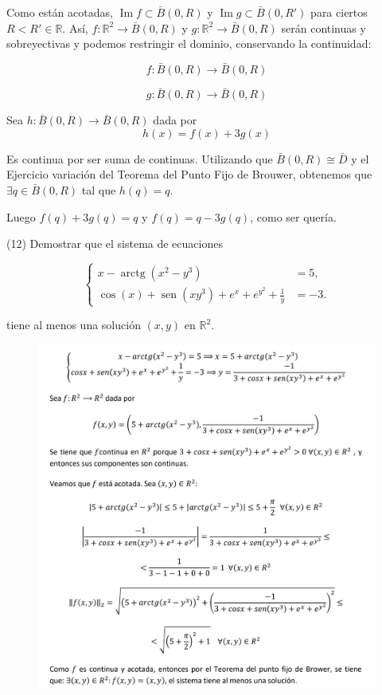 \documentclass[
  a4paper,
  spanish,
  12pt,
]{scrartcl}
\begin{document}
\begin{sol}
Como están acotadas, $\operatorname{Im} f \subset \bar{B}(0, R)$ y $\operatorname{Im} g \subset \bar{B}(0, R')$ para ciertos $R < R' \in \mathbb{R}$.
Así, $f : \mathbb{R}^2 \rightarrow \bar{B}(0, R)$ y $g: \mathbb{R}^2 \rightarrow \bar{B}(0, R)$
serán continuas y sobreyectivas y podemos restringir el dominio, conservando la continuidad:

$$
f: \bar{B}(0, R) \rightarrow \bar{B}(0, R)
$$

$$
g: \bar{B}(0, R) \rightarrow \bar{B}(0, R)
$$

Sea $h: \bar{B}(0,R) \rightarrow \bar{B}(0, R)$ dada por
$$ h(x) = f(x) + 3g(x) $$

Es continua por ser suma de continuas. Utilizando que $\bar{B}(0, R) \cong \bar{D}$
y el Ejercicio variación del Teorema del Punto Fijo de Brouwer, obtenemos que $\exists q \in \bar{B}(0, R) $ tal que
$h(q) = q$.

Luego $f(q) + 3g(q) = q$ y $f(q) = q - 3g(q)$, como ser quería.

\end{sol}

\begin{ejer}
(12) Demostrar que el sistema de ecuaciones

$$
\left\{\begin{aligned}
x-\operatorname{arctg}\left(x^{2}-y^{3}\right) & =5, \\
\cos (x)+\operatorname{sen}\left(x y^{3}\right)+e^{x}+e^{y^{2}}+\frac{1}{y} & =-3 .
\end{aligned}\right.
$$

tiene al menos una solución $(x, y)$ en $\mathbb{R}^{2}$.\\
\end{ejer}

\begin{figure}[h]
	\centering
	\includegraphics[width=\textwidth]{ej12.png}
\end{figure}
\end{document}
